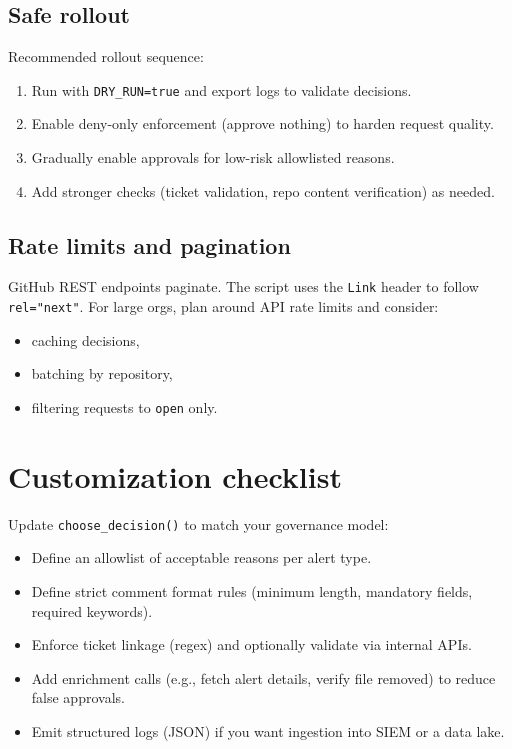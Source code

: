 \documentclass[11pt]{article}
\begin{document}
\subsection{Safe rollout}

Recommended rollout sequence:
\begin{enumerate}
  \item Run with \texttt{DRY\_RUN=true} and export logs to validate decisions.
  \item Enable deny-only enforcement (approve nothing) to harden request quality.
  \item Gradually enable approvals for low-risk allowlisted reasons.
  \item Add stronger checks (ticket validation, repo content verification) as needed.
\end{enumerate}

\subsection{Rate limits and pagination}

GitHub REST endpoints paginate. The script uses the \texttt{Link} header to follow \texttt{rel="next"}.
For large orgs, plan around API rate limits and consider:
\begin{itemize}
  \item caching decisions,
  \item batching by repository,
  \item filtering requests to \texttt{open} only.
\end{itemize}

\section{Customization checklist}

Update \texttt{choose\_decision()} to match your governance model:
\begin{itemize}
  \item Define an allowlist of acceptable reasons per alert type.
  \item Define strict comment format rules (minimum length, mandatory fields, required keywords).
  \item Enforce ticket linkage (regex) and optionally validate via internal APIs.
  \item Add enrichment calls (e.g., fetch alert details, verify file removed) to reduce false approvals.
  \item Emit structured logs (JSON) if you want ingestion into SIEM or a data lake.
\end{itemize}
\end{document}
